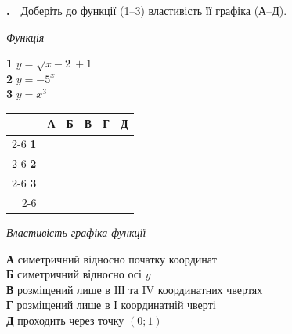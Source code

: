 \documentclass[12pt]{article}
\newcommand{\matchingGrid}{%
    \begingroup
    \renewcommand{\arraystretch}{1.15}
    \setlength{\tabcolsep}{4pt}
    \footnotesize
    \begin{tabular}{r|c|c|c|c|c|}
         \multicolumn{1}{c}{} & \multicolumn{1}{c}{\textbf{А}} & \multicolumn{1}{c}{\textbf{Б}} & \multicolumn{1}{c}{\textbf{В}} & \multicolumn{1}{c}{\textbf{Г}} & \multicolumn{1}{c}{\textbf{Д}} \\ \cline{2-6}
         \textbf{1} & \phantom{X} & \phantom{X} & \phantom{X} & \phantom{X} & \phantom{X} \\ \cline{2-6}
         \textbf{2} & & & & & \\ \cline{2-6}
         \textbf{3} & & & & & \\ \cline{2-6}
    \end{tabular}
    \endgroup
}
\newcounter{zad}
\newcommand{\zadtask}[1]{\stepcounter{zad}\par\vspace{0.3cm}\noindent\textbf{\thezad.}\ \ #1\par\vspace{0.2cm}}
\begin{document}
\zadtask{Доберіть до функції (1--3) властивість її графіка (А--Д).\par
\vspace{0.3cm}
\noindent
\begin{minipage}[t]{0.30\textwidth}
\textit{Функція}\par\vspace{0.2cm}
\textbf{1} \quad $y = \sqrt{x-2} + 1$\\[0.25cm]
\textbf{2} \quad $y = -5^x$\\[0.25cm]
\textbf{3} \quad $y = x^3$
\par\vspace{0.4cm}
\matchingGrid
\end{minipage}%
\hfill
\begin{minipage}[t]{0.66\textwidth}
\textit{Властивість графіка функції}\par\vspace{0.2cm}
\textbf{А} \quad симетричний відносно початку координат\\[0.15cm]
\textbf{Б} \quad симетричний відносно осі $y$\\[0.15cm]
\textbf{В} \quad розміщений лише в ІІІ та IV координатних чвертях\\[0.15cm]
\textbf{Г} \quad розміщений лише в І координатній чверті\\[0.15cm]
\textbf{Д} \quad проходить через точку $(0; 1)$
\end{minipage}}
\end{document}

